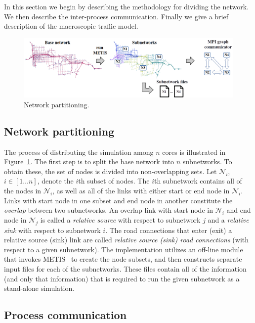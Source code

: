 In this section we begin by describing the methodology for dividing the network. We then describe the inter-process communication. Finally we give a brief description of the macroscopic traffic model. 

\begin{figure}
\centering
  \includegraphics[width=\textwidth]{figs/splitter.png}
  \caption{Network partitioning.}
  \label{fig:partition}
\end{figure}

\subsection{Network partitioning}
The process of distributing the simulation among $n$ cores is illustrated in Figure~\ref{fig:partition}. The first step is to split the base network into $n$ subnetworks. To obtain these, the set of nodes is divided into non-overlapping sets. Let $\mathcal{N}_i$, $i\in[1\hdots n]$, denote the $i$th subset of nodes. The $i$th subnetwork contains all of the nodes in $\mathcal{N}_i$, as well as all of the links with either start or end node in $\mathcal{N}_i$. 
Links with start node in one subset and end node in another constitute the \textit{overlap} between two subnetworks. An overlap link with start node in $\mathcal{N}_i$ and end node in $\mathcal{N}_j$ is called a \textit{relative source} with respect to subnetwork $j$ and a \textit{relative sink} with respect to subnetwork $i$. The road connections that enter (exit) a relative source (sink) link are called \textit{relative source (sink) road connections} (with respect to a given subnetwork). The implementation utilizes an off-line module that invokes METIS~\cite{kaku:98a} to create the node subsets, and then constructs separate input files for each of the subnetworks. These files contain all of the information (and only that information) that is required to run the given subnetwork as a stand-alone simulation. 

\subsection{Process communication}

